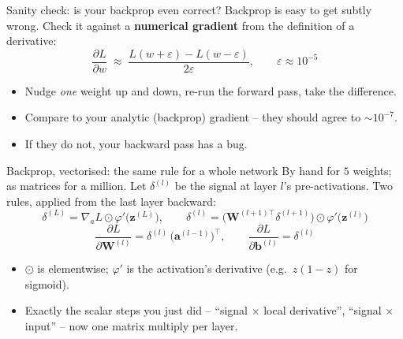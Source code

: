 \documentclass[aspectratio=169]{beamer}
\begin{document}
\begin{frame}{Sanity check: is your backprop even correct?}
  Backprop is easy to get subtly wrong. Check it against a \textbf{numerical gradient} from
  the definition of a derivative:
  \[
    \frac{\partial L}{\partial w} \;\approx\; \frac{L(w+\varepsilon) - L(w-\varepsilon)}{2\varepsilon},
    \qquad \varepsilon \approx 10^{-5}
  \]
  \begin{itemize}\small
    \item Nudge \emph{one} weight up and down, re-run the forward pass, take the difference.
    \item Compare to your analytic (backprop) gradient -- they should agree to $\sim 10^{-7}$.
    \item If they do not, your backward pass has a bug.
  \end{itemize}
  \vfill
\end{frame}

\begin{frame}{Backprop, vectorised: the same rule for a whole network}
  By hand for $5$ weights; as matrices for a million. Let $\delta^{(l)}$ be the signal at
  layer $l$'s pre-activations. Two rules, applied from the last layer backward:
  \vfill
  \[
    \delta^{(L)} = \nabla_{\!a} L \odot \varphi'\!\big(\mathbf{z}^{(L)}\big),
    \qquad
    \delta^{(l)} = \big(\mathbf{W}^{(l+1)\top}\delta^{(l+1)}\big) \odot \varphi'\!\big(\mathbf{z}^{(l)}\big)
  \]
  \[
    \frac{\partial L}{\partial \mathbf{W}^{(l)}} = \delta^{(l)}\,\big(\mathbf{a}^{(l-1)}\big)^{\!\top},
    \qquad
    \frac{\partial L}{\partial \mathbf{b}^{(l)}} = \delta^{(l)}
  \]
  \vfill
  \begin{itemize}\small
    \item $\odot$ is elementwise; $\varphi'$ is the activation's derivative (e.g.\ $z(1-z)$ for
      sigmoid).
    \item Exactly the scalar steps you just did -- ``signal $\times$ local derivative'',
      ``signal $\times$ input'' -- now one matrix multiply per layer.
  \end{itemize}
\end{frame}
\end{document}
